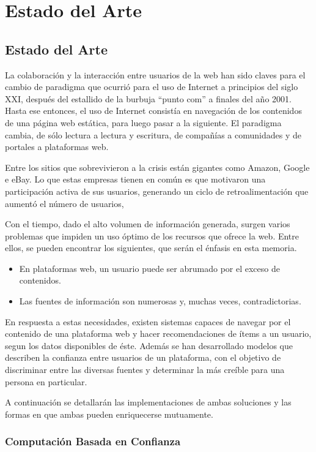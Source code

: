 \chapter{Estado del Arte}

\section{Estado del Arte}
La colaboración y la interacción entre usuarios de la web han sido claves para el cambio de paradigma que ocurrió para el uso de Internet a principios del siglo XXI, después del estallido de la burbuja “punto com” a finales del año 2001. Hasta ese entonces, el uso de Internet consistía en navegación de los contenidos de una página web estática,  para luego pasar a la siguiente.  El paradigma cambia, de sólo lectura a lectura y escritura, de compañías a comunidades y de portales a plataformas web.\cite{Aghaei2012}

Entre los sitios que sobrevivieron a la crisis están gigantes como Amazon, Google e eBay. Lo que estas empresas tienen en común es que motivaron una participación activa de sus usuarios, generando un ciclo de retroalimentación que aumentó el número de usuarios,  

Con el tiempo, dado el alto volumen de información generada, surgen varios problemas que impiden un uso óptimo de los recursos que ofrece la web. Entre ellos, se pueden encontrar los siguientes, que serán el énfasis en esta memoria.

\begin{itemize}
\item{En plataformas web, un usuario puede ser abrumado por el exceso de contenidos. }
\item{Las fuentes de información son numerosas y, muchas veces, contradictorias. }
\end{itemize}

En respuesta a estas necesidades, existen sistemas capaces de navegar por el contenido de una plataforma web y hacer recomendaciones de ítems a un usuario,  segun los datos disponibles de éste. Además se han desarrollado modelos que describen la confianza entre usuarios de un plataforma, con el objetivo de discriminar entre las diversas fuentes y determinar la más creíble para una persona en particular. 

A continuación se detallarán las implementaciones de ambas soluciones y las formas en que ambas pueden enriquecerse mutuamente.

\subsection{Computación Basada en Confianza}

